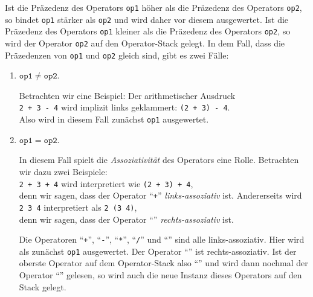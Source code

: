 Ist die Pr\"azedenz des Operators \texttt{op1} h\"oher als die Pr\"azedenz des Operators \texttt{op2}, so
bindet \texttt{op1} st\"arker als \texttt{op2} und wird daher vor diesem ausgewertet.
Ist die Pr\"azedenz des Operators \texttt{op1} kleiner als die Pr\"azedenz des Operators \texttt{op2}, so
wird der Operator \texttt{op2} auf den Operator-Stack gelegt.
In dem Fall, dass die Pr\"azedenzen von \texttt{op1} und \texttt{op2} gleich sind, gibt es zwei F\"alle:
\begin{enumerate}
\item $\mathtt{op1} \not= \mathtt{op2}$.

      Betrachten wir eine Beispiel: Der arithmetischer Ausdruck \\[0.1cm]
      \hspace*{1.3cm} \texttt{2 + 3 - 4} \quad wird implizit links geklammert: \quad \texttt{(2 + 3) - 4}. \\[0.1cm]
      Also wird in diesem Fall zun\"achst \texttt{op1} ausgewertet.  
\item $\mathtt{op1} = \mathtt{op2}$.

      In diesem Fall  spielt die \emph{Assoziativit\"at} des Operators eine Rolle.
      Betrachten wir dazu zwei Beispiele: \\[0.1cm]
      \hspace*{1.3cm} \texttt{2 + 3 + 4} \quad wird interpretiert wie \quad \texttt{(2 + 3) + 4}, \\[0.1cm]
      denn wir sagen, dass der Operator ``\texttt{+}'' \emph{links-assoziativ}
      ist. Andererseits wird \\[0.1cm]
      \hspace*{1.3cm} \texttt{2  3  4}  \quad interpretiert als \quad \texttt{2  (3  4)}, \\[0.1cm]
      denn wir sagen, dass der Operator ``\texttt{}'' \emph{rechts-assoziativ} ist.

      Die Operatoren ``\texttt{+}'', ``\texttt{-}'', ``\texttt{*}'', ``\texttt{/}'' und 
      ``\texttt{}'' sind alle links-assoziativ.  Hier wird als zun\"achst \texttt{op1} ausgewertet.
      Der Operator  ``\texttt{}'' ist rechts-assoziativ.  Ist der oberste
      Operator auf dem Operator-Stack also ``\texttt{}'' und wird dann nochmal
      der Operator ``\texttt{}'' gelesen, so wird auch die neue Instanz dieses
      Operators auf den Stack gelegt.
\end{enumerate}
